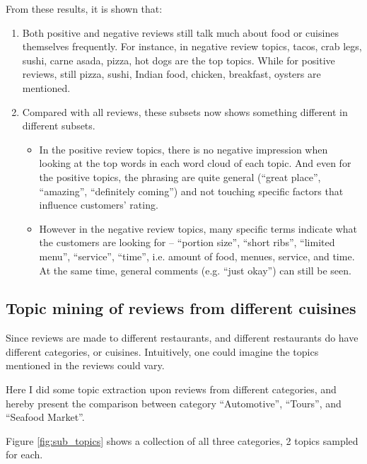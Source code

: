 \documentclass[11pt]{article}
\begin{document}
From these results, it is shown that:
\begin{enumerate}
  \item Both positive and negative reviews still talk much about food or cuisines themselves frequently. For instance, in negative review topics, tacos, crab legs, sushi, carne asada, pizza, hot dogs are the top topics. While for positive reviews, still pizza, sushi, Indian food, chicken, breakfast, oysters are mentioned.
  \item Compared with all reviews, these subsets now shows something different in different subsets.
    \begin{itemize}
      \item In the positive review topics, there is no negative impression when looking at the top words in each word cloud of each topic. And even for the positive topics, the phrasing are quite general (``great place'', ``amazing'', ``definitely coming'') and not touching specific factors that influence customers' rating.
      \item However in the negative review topics, many specific terms indicate what the customers are looking for -- ``portion size'', ``short ribs'', ``limited menu'', ``service'', ``time'', i.e. amount of food, menues, service, and time. At the same time, general comments (e.g. ``just okay'') can still be seen.
    \end{itemize}
\end{enumerate}


\subsection{Topic mining of reviews from different cuisines}
Since reviews are made to different restaurants, and different restaurants do have different categories, or cuisines. Intuitively, one could imagine the topics mentioned in the reviews could vary.

Here I did some topic extraction upon reviews from different categories, and hereby present the comparison between category ``Automotive'', ``Tours'', and ``Seafood Market''.

Figure \ref{fig:sub_topics} shows a collection of all three categories, 2 topics sampled for each.
\end{document}
